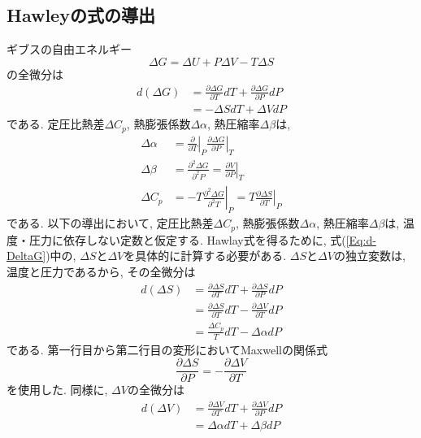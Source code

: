 \subsection{Hawleyの式の導出}
ギブスの自由エネルギー
\begin{equation}
    \Delta G = \Delta U + P\Delta V - T \Delta S
\end{equation}
の全微分は
\begin{align}
    d(\Delta G) &=
    \frac{\partial \Delta G}{\partial T} dT +
    \frac{\partial \Delta G}{\partial P} dP
    \\ &=
    -\Delta S dT + \Delta V dP
    \label{Eq:d-DeltaG}
\end{align}
である. 
定圧比熱差$\Delta C_{p}$, 熱膨張係数$\Delta \alpha$, 熱圧縮率$\Delta \beta$は, 
\begin{align}
    \Delta \alpha &=
    \left. \frac{\partial}{\partial T} \right|_{P}
    \left. \frac{\partial \Delta G}{\partial P} \right|_{T} \\
    \Delta \beta &=
    \frac{\partial^{2} \Delta G}{\partial^{2}P} =
    \left. \frac{\partial V}{\partial P} \right|_{T} \\
    \Delta C_{p} &=
    \left. -T \frac{\partial^{2} \Delta G}{\partial^{2}T}\right|_{P} =
    \left. T \frac{\partial \Delta S}{\partial T}\right|_{P}
\end{align}
である. 
以下の導出において, 定圧比熱差$\Delta C_{p}$, 熱膨張係数$\Delta \alpha$, 熱圧縮率$\Delta \beta$は, 
温度・圧力に依存しない定数と仮定する. 
Hawlay式を得るために, 式(\ref{Eq:d-DeltaG})中の, $\Delta S$と$\Delta V$を具体的に計算する必要がある. 
$\Delta S$と$\Delta V$の独立変数は, 温度と圧力であるから, その全微分は
\begin{align}
    d(\Delta S) &=
    \frac{\partial \Delta S}{\partial T} dT + \frac{\partial \Delta S}{\partial P} dP \\ &=
    \frac{\partial \Delta S}{\partial T} dT - \frac{\partial \Delta V}{\partial T} dP \\ &=
    \frac{\Delta C_{p}}{T}dT - \Delta \alpha dP
\end{align}
である. 第一行目から第二行目の変形においてMaxwellの関係式
\begin{equation}
    \frac{\partial \Delta S}{\partial P} = - \frac{\partial \Delta V}{\partial T}
\end{equation}
を使用した. 
同様に, $\Delta V$の全微分は
\begin{align}
    d(\Delta V) &=
    \frac{\partial \Delta V}{\partial T} dT + \frac{\partial \Delta V}{\partial P} dP \\ &=
    \Delta \alpha dT + \Delta \beta dP
\end{align}
